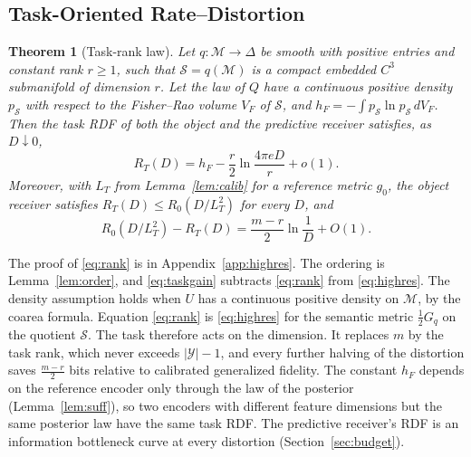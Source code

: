 \documentclass[10pt,journal]{IEEEtran}
\newtheorem{theorem}{Theorem}
\newcommand{\M}{\mathcal M}
\newcommand{\Sset}{\mathcal S}
\begin{document}
\subsection{Task-Oriented Rate--Distortion}
\begin{theorem}[Task-rank law]\label{thm:rank}
Let $q:\M\to\Delta$ be smooth with positive entries and constant rank $r\ge1$, such that $\Sset=q(\M)$ is a compact embedded $C^3$ submanifold of dimension $r$. Let the law of $Q$ have a continuous positive density $p_\Sset$ with respect to the Fisher--Rao volume $V_F$ of $\Sset$, and $h_F=-\int p_\Sset\ln p_\Sset\,dV_F$. Then the task RDF of both the object and the predictive receiver satisfies, as $D\downarrow0$,
\begin{equation}
 R_T(D)=h_F-\frac r2\ln\frac{4\pi eD}{r}+o(1). \label{eq:rank}
\end{equation}
Moreover, with $L_T$ from Lemma~\ref{lem:calib} for a reference metric $g_0$, the object receiver satisfies $R_T(D)\le R_0(D/L_T^2)$ for every $D$, and
\begin{equation}
 R_0(D/L_T^2)-R_T(D)=\frac{m-r}2\ln\frac1D+O(1). \label{eq:taskgain}
\end{equation}
\end{theorem}
The proof of \eqref{eq:rank} is in Appendix~\ref{app:highres}. The ordering is Lemma~\ref{lem:order}, and \eqref{eq:taskgain} subtracts \eqref{eq:rank} from \eqref{eq:highres}. The density assumption holds when $U$ has a continuous positive density on $\M$, by the coarea formula. Equation \eqref{eq:rank} is \eqref{eq:highres} for the semantic metric $\frac12G_q$ on the quotient $\Sset$. The task therefore acts on the dimension. It replaces $m$ by the task rank, which never exceeds $|\mathcal Y|-1$, and every further halving of the distortion saves $\frac{m-r}2$ bits relative to calibrated generalized fidelity. The constant $h_F$ depends on the reference encoder only through the law of the posterior (Lemma~\ref{lem:suff}), so two encoders with different feature dimensions but the same posterior law have the same task RDF. The predictive receiver's RDF is an information bottleneck curve at every distortion (Section~\ref{sec:budget}).
\end{document}
